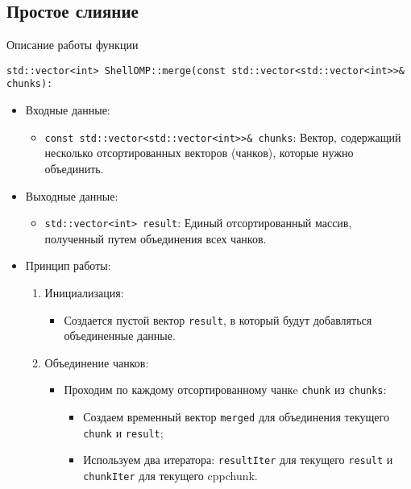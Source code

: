 \documentclass[]{article}
\theoremstyle{remark}
\theoremstyle{definition}
\newcommand{\cpp}[1]{\texttt{#1}}
\begin{document}
\subsection{Простое слияние}

\par Описание работы функции
\begin{verbatim}
std::vector<int> ShellOMP::merge(const std::vector<std::vector<int>>& chunks):
\end{verbatim}

\begin{itemize}
    \item Входные данные:

    \begin{itemize}
        \item \cpp{const std::vector<std::vector<int>>& chunks}: Вектор, содержащий несколько отсортированных векторов (чанков), которые нужно объединить.
    \end{itemize}

    \item Выходные данные:

    \begin{itemize}
        \item \cpp{std::vector<int> result}: Единый отсортированный массив, полученный путем объединения всех чанков.
    \end{itemize}
    
    \item Принцип работы:
    \begin{enumerate}
        
        \item Инициализация:
        \begin{itemize}
            \item Создается пустой вектор \cpp{result}, в который будут добавляться объединенные данные.
        \end{itemize}
        
        \item Объединение чанков:
        \begin{itemize}
            \item Проходим по каждому отсортированному чанкe \cpp{chunk} из \cpp{chunks}:
            \begin{itemize}
                \item Создаем временный вектор \cpp{merged} для объединения текущего \cpp{chunk} и \cpp{result};
                \item Используем два итератора: \cpp{resultIter} для текущего \cpp{result} и \cpp{chunkIter} для текущего cpp{chunk}.
            \end{itemize}
        \end{itemize}


\end{enumerate}
\end{itemize}
\end{document}
